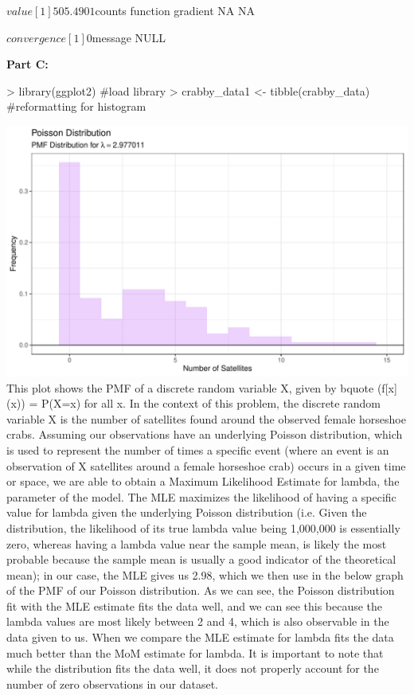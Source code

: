 \documentclass{article}
\begin{document}
\begin{enumerate}
\begin{Schunk}
\begin{Soutput}
$value
[1] 505.4901

$counts
function gradient 
      NA       NA 

$convergence
[1] 0

$message
NULL
\end{Soutput}
\end{Schunk}

\textbf{Part C:}
\begin{Schunk}
\begin{Sinput}
> library(ggplot2) #load library
> crabby_data1 <- tibble(crabby_data) #reformatting for histogram
\end{Sinput}
\end{Schunk}

\includegraphics{HW1-024}
\newline
{}
\newline
This plot shows the PMF of a discrete random variable X, given by bquote (f[x] (x)) = P(X=x) for all x. In the context of this problem, the discrete random variable X is the number of satellites found around the observed female horseshoe crabs. Assuming our observations have an underlying Poisson distribution, which is used to represent the number of times a specific event (where an event is an observation of X satellites around a female horseshoe crab) occurs in a given time or space, we are able to obtain a Maximum Likelihood Estimate for lambda, the parameter of the model. The MLE maximizes the likelihood of having a specific value for lambda given the underlying Poisson distribution (i.e. Given the distribution, the likelihood of its true lambda value being 1,000,000 is essentially zero, whereas having a lambda value near the sample mean, is likely the most probable because the sample mean is usually a good indicator of the theoretical mean); in our case, the MLE gives us 2.98, which we then use in the below graph of the PMF of our Poisson distribution. As we can see, the Poisson distribution fit with the MLE estimate fits the data well, and we can see this because the lambda values are most likely between 2 and 4, which is also observable in the data given to us. When we compare the MLE estimate for lambda fits the data much better than the MoM estimate for lambda. It is important to note that while the distribution fits the data well, it does not properly account for the number of zero observations in our dataset. 


\end{enumerate}
\end{document}
